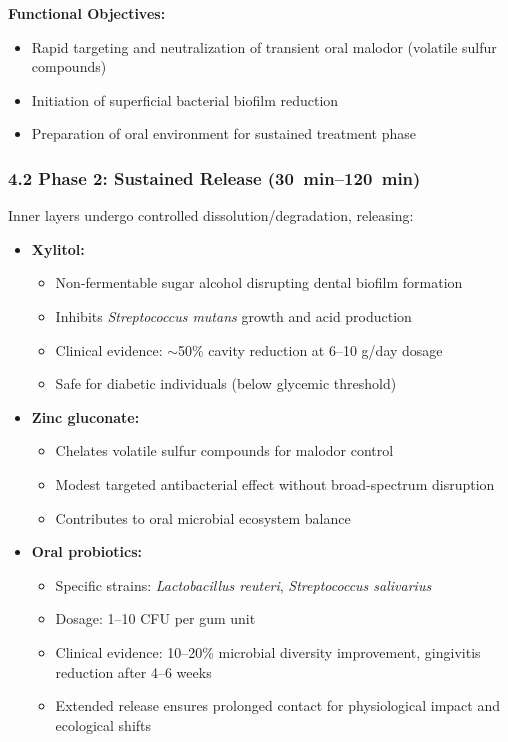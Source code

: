 \documentclass[12pt]{article}
\begin{document}
\textbf{Functional Objectives:}
\begin{itemize}
    \item Rapid targeting and neutralization of transient oral malodor (volatile sulfur compounds)
    \item Initiation of superficial bacterial biofilm reduction
    \item Preparation of oral environment for sustained treatment phase
\end{itemize}

\subsubsection*{4.2 Phase 2: Sustained Release (\SIrange{30}{120}{\minute})}
Inner layers undergo controlled dissolution/degradation, releasing:

\begin{itemize}
    \item \textbf{Xylitol:}
    \begin{itemize}
        \item Non-fermentable sugar alcohol disrupting dental biofilm formation
        \item Inhibits \textit{Streptococcus mutans} growth and acid production
        \item Clinical evidence: $\sim$50\% cavity reduction at 6--10 g/day dosage
        \item Safe for diabetic individuals (below glycemic threshold)
    \end{itemize}
    
    \item \textbf{Zinc gluconate:}
    \begin{itemize}
        \item Chelates volatile sulfur compounds for malodor control
        \item Modest targeted antibacterial effect without broad-spectrum disruption
        \item Contributes to oral microbial ecosystem balance
    \end{itemize}
    
    \item \textbf{Oral probiotics:}
    \begin{itemize}
        \item Specific strains: \textit{Lactobacillus reuteri}, \textit{Streptococcus salivarius}
        \item Dosage: \SIrange{1}{10}{\billion} CFU per gum unit
        \item Clinical evidence: 10--20\% microbial diversity improvement, gingivitis reduction after 4--6 weeks
        \item Extended release ensures prolonged contact for physiological impact and ecological shifts
    \end{itemize}
\end{itemize}
\end{document}

